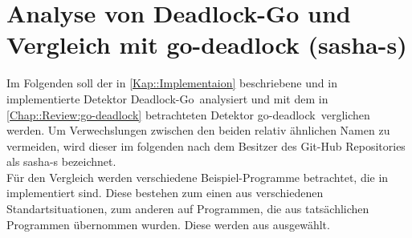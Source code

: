 \chapter{Analyse von Deadlock-Go und Vergleich mit 
    go-deadlock (sasha-s)}
Im Folgenden soll der in \ref{Kap::Implementaion} beschriebene und in 
\cite{implementation} implementierte Detektor \glqq Deadlock-Go\grqq\ analysiert 
und mit dem in 
\ref{Chap::Review:go-deadlock} betrachteten Detektor \glqq go-deadlock\grqq\ verglichen
werden. Um Verwechslungen zwischen den beiden relativ ähnlichen Namen zu vermeiden,
wird dieser im folgenden nach dem Besitzer des Git-Hub Repositories als sasha-s
bezeichnet.\\
Für den Vergleich werden verschiedene Beispiel-Programme betrachtet, die in 
\cite{examples} implementiert sind. Diese bestehen zum einen aus verschiedenen 
Standartsituationen, zum anderen auf Programmen, die aus tatsächlichen
Programmen übernommen wurden. Diese werden aus \cite{gobench} ausgewählt.
